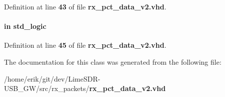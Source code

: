 Definition at line {\bf 43} of file {\bf rx\+\_\+pct\+\_\+data\+\_\+v2.\+vhd}.

\paragraph[{tx\+\_\+pct\+\_\+loss\+\_\+clr}]{ {\bfseries \textcolor{keywordflow}{in}\textcolor{vhdlchar}{ }} {\bfseries \textcolor{comment}{std\+\_\+logic}\textcolor{vhdlchar}{ }} \hspace{0.3cm}{\ttfamily [Port]}}\label{classrx__pct__data__v2_a83b4174e47ecaf72e6a38d049a483891}


Definition at line {\bf 45} of file {\bf rx\+\_\+pct\+\_\+data\+\_\+v2.\+vhd}.



The documentation for this class was generated from the following file\+:\begin{DoxyCompactItemize}
\item 
/home/erik/git/dev/\+Lime\+S\+D\+R-\/\+U\+S\+B\+\_\+\+G\+W/src/rx\+\_\+packets/{\bf rx\+\_\+pct\+\_\+data\+\_\+v2.\+vhd}\end{DoxyCompactItemize}
